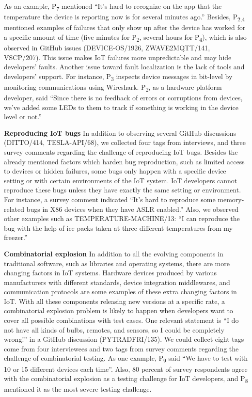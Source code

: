As an example, P\textsubscript{7} mentioned \enquote{It's hard to recognize on the app that the temperature the device is reporting now is for several minutes ago.} Besides, P\textsubscript{2,4} mentioned examples of failures that only show up after the device has worked for a specific amount of time (five minutes for P\textsubscript{2}, several hours for P\textsubscript{4}), which is also observed in GitHub issues (DEVICE-OS/1926, ZWAVE2MQTT/141, VSCP/207). This issue makes IoT failures more unpredictable and may hide developers' faults. Another issue toward fault localization is the lack of tools and developers' support. For instance, P\textsubscript{3} inspects device messages in bit-level by monitoring communications using Wireshark. P\textsubscript{2}, as a hardware platform developer, said \enquote{Since there is no feedback of errors or corruptions from devices, we've added some LEDs to them to track if something is working in the device level or not.}


\textbf{Reproducing IoT bugs}
In addition to observing several GitHub discussions (DITTO/414, TESLA-API/68), we collected four tags from interviews, and three survey comments regarding the challenge of reproducing IoT bugs. Besides the already mentioned factors which harden bug reproduction, such as limited access to devices or hidden failures, some bugs only happen with a specific device setting or with certain environments of the IoT system. IoT developers cannot reproduce these bugs unless they have exactly the same setting or environment. For instance, a survey comment indicated \enquote{It's hard to reproduce some memory-related bugs in X86 devices when they have ASLR enabled.}
Also, we observed other examples such as TEMPERATURE-MACHINE/13: \enquote{I can reproduce the bug with the help of ice packs taken at three different temperatures from my freezer.}

\textbf{Combinatorial explosion}
In addition to all the evolving components in traditional software, such as libraries and operating systems, there are more changing factors in IoT systems. Hardware devices produced by various manufacturers with different standards, device integration middlewares, and communication protocols are some examples of these extra changing factors in IoT. With all these components releasing new versions at a specific rate, a combinatorial explosion problem is likely to happen when developers want to cover all possible combinations with test cases.
One relevant statement is \enquote{I do not have all kinds of bulbs, remotes, and sensors, so I could be completely wrong!} in a GitHub discussion (PYTRADFRI/135). We could collect eight tags come from four interviewees and two tags from survey comments regarding the challenge of combinatorial testing. As one example, P\textsubscript{9} said \enquote{We have to test with 10 or 15 different devices each time}. Also, 80 percent of survey respondents agree with the combinatorial explosion as a testing challenge for IoT developers, and P\textsubscript{8} mentioned it as the most severe testing challenge. 

